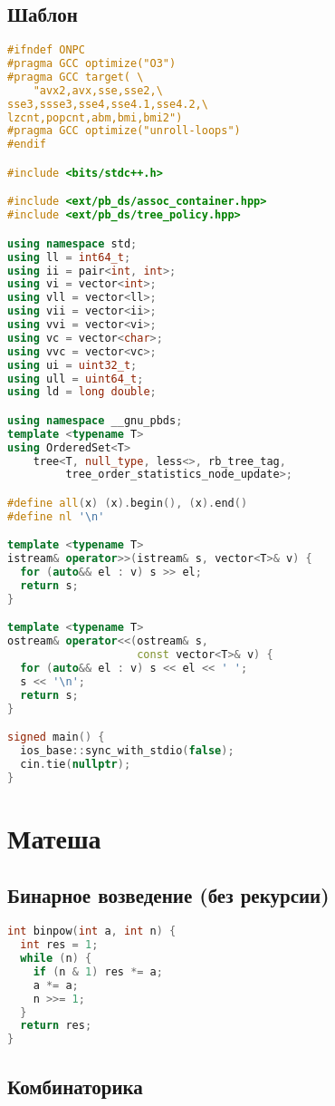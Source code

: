 \documentclass[10pt,a4paper,landscape,twosided]{extarticle}
\begin{document}
\begin{multicols}{3}
\subsection{Шаблон}
\begin{lstlisting}[language=C++]
#ifndef ONPC
#pragma GCC optimize("O3")
#pragma GCC target( \
    "avx2,avx,sse,sse2,\
sse3,ssse3,sse4,sse4.1,sse4.2,\
lzcnt,popcnt,abm,bmi,bmi2")
#pragma GCC optimize("unroll-loops")
#endif

#include <bits/stdc++.h>

#include <ext/pb_ds/assoc_container.hpp>
#include <ext/pb_ds/tree_policy.hpp>

using namespace std;
using ll = int64_t;
using ii = pair<int, int>;
using vi = vector<int>;
using vll = vector<ll>;
using vii = vector<ii>;
using vvi = vector<vi>;
using vc = vector<char>;
using vvc = vector<vc>;
using ui = uint32_t;
using ull = uint64_t;
using ld = long double;

using namespace __gnu_pbds;
template <typename T>
using OrderedSet<T>
    tree<T, null_type, less<>, rb_tree_tag,
         tree_order_statistics_node_update>;

#define all(x) (x).begin(), (x).end()
#define nl '\n'

template <typename T>
istream& operator>>(istream& s, vector<T>& v) {
  for (auto&& el : v) s >> el;
  return s;
}

template <typename T>
ostream& operator<<(ostream& s,
                    const vector<T>& v) {
  for (auto&& el : v) s << el << ' ';
  s << '\n';
  return s;
}

signed main() {
  ios_base::sync_with_stdio(false);
  cin.tie(nullptr);
}
\end{lstlisting}

\section{Матеша}

\subsection{Бинарное возведение (без рекурсии)}
\begin{lstlisting}[language=C++]
int binpow(int a, int n) {
  int res = 1;
  while (n) {
    if (n & 1) res *= a;
    a *= a;
    n >>= 1;
  }
  return res;
}
\end{lstlisting}

\subsection{Комбинаторика}


\end{multicols}
\end{document}
